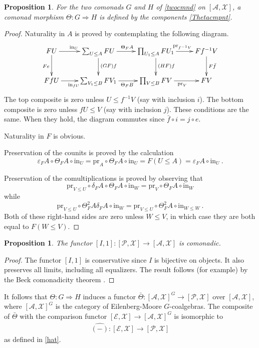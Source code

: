 \documentclass[a4paper,12pt,reqno]{amsart}
\newtheorem{proposition}[theorem]{Proposition}
\theoremstyle{definition}
\theoremstyle{fact}
\theoremstyle{genquest}
\theoremstyle{step}
\newcommand{\lra}{\longrightarrow}
\newcommand{\Lra}{\Longrightarrow}
\def\CA{{\mathscr A}}
\def\CE{{\mathscr E}}
\def\CP{{\mathscr P}}
\def\CX{{\mathscr X}}
\begin{document}
\begin{proposition}
For the two comonads $G$ and $H$ of \eqref{twocmnd} on $[\CA,\CX]$, a comonad morphism $\Theta : G \Lra H$ is defined by the components \eqref{Thetacmpnt}.
\end{proposition}
\begin{proof}
Naturality in $A$ is proved by contemplating the following diagram.
\begin{equation*}
\xymatrix{
FU \ar[d]_{Fe}\ar[r]^{\mathrm{in}_U \ }  & \sum_{U\le A}{FU}\ar[d]^{(GF)f} \ar[r]^{\Theta_FA} & \prod_{U_1\le A}{FU_1} \ar[d]^{(HF)f} \ar[r]^{ \ \mathrm{pr}_{f^{-1}V}} 
& Ff^{-1}V \ar[d]^{F\bar{f}} \\
FfU\ar[r]_{\mathrm{in}_{fU} \ }  & \sum_{V_1\le B}{FV_1}\ar[r]_{\Theta_FB} & \prod_{V\le B}{FV}\ar[r]_{ \ \mathrm{pr}_V} 
& FV }
\end{equation*}
The top composite is zero unless $U\le f^{-1}V$ (say with inclusion $i$). 
The bottom composite is zero unless $fU\le V$ (say with inclusion $j$). 
These conditions are the same.
When they hold, the diagram commutes since $\bar{f} \circ i = j \circ e$.  

Naturality in $F$ is obvious. 

Preservation of the counits is proved by the calculation
$$\varepsilon_FA\circ \Theta_FA \circ \mathrm{in}_U = \mathrm{pr}_A\circ \Theta_FA \circ \mathrm{in}_U
= F(U\le A) = \varepsilon_FA\circ \mathrm{in}_U \ .$$ 

Preservation of the comultiplications is proved by observing that 
$$\mathrm{pr}_{V\le U} \circ \delta_FA \circ \Theta_FA \circ \mathrm{in}_W
= \mathrm{pr}_{V} \circ \Theta_FA \circ \mathrm{in}_W$$
while
$$\mathrm{pr}_{V\le U} \circ \Theta^2_FA \delta_FA  \circ \mathrm{in}_W
= \mathrm{pr}_{V\le U} \circ \Theta^2_FA \circ \mathrm{in}_{W\le W} \ .$$
Both of these right-hand sides are zero unless $W\le V$, in which case they
are both equal to $F(W\le V)$. 
\end{proof}

\begin{proposition}
The functor $[I,1] : [\CP,\CX]\lra [\CA,\CX]$ is comonadic.
\end{proposition}
\begin{proof}
The functor $[I,1]$ is conservative since $I$ is bijective on objects.
It also preserves all limits, including all equalizers.
The result follows (for example) by the Beck comonadicity theorem \cite{ML1963}.
\end{proof}

It follows that $\Theta :G\Lra H$
induces a functor $\bar{\Theta} : [\CA,\CX]^G \lra [\CP,\CX]$ over $[\CA,\CX]$, 
where $[\CA,\CX]^G$ is the category of Eilenberg-Moore $G$-coalgebras.  
The composite of $\bar{\Theta}$ with the comparison functor 
$[\CE,\CX] \lra [\CA,\CX]^G$ is isomorphic to  
\begin{eqnarray}\label{hatX}
\widehat{(-)} : [\CE, \CX] \lra [\CP, \CX]
\end{eqnarray}
as defined in \eqref{hat}.
\end{document}
